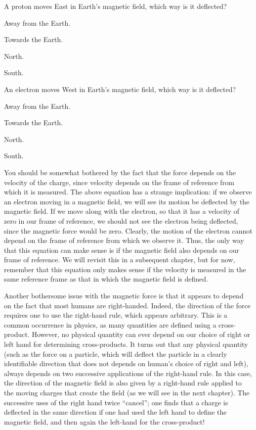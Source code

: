 \begin{checkpoint}{}
	\begin{MCquestion}{A proton moves East in Earth's magnetic field, which way is it deflected?}
		\item Away from the Earth. \correct
		\item Towards the Earth. 
		\item North.
		\item South.
	\end{MCquestion}
\end{checkpoint}

\begin{checkpoint}{}
	\begin{MCquestion}{An electron moves West in Earth's magnetic field, which way is it deflected?}
		\item Away from the Earth. \correct
		\item Towards the Earth. 
		\item North.
		\item South.
	\end{MCquestion}
\end{checkpoint}

You should be somewhat bothered by the fact that the force depends on the velocity of the charge, since velocity depends on the frame of reference from which it is measured. The above equation has a strange implication: if we observe an electron moving in a magnetic field, we will see its motion be deflected by the magnetic field. If we move along with the electron, so that it has a velocity of zero in our frame of reference, we should not see the electron being deflected, since the magnetic force would be zero. Clearly, the motion of the electron cannot depend on the frame of reference from which we observe it. Thus, the only way that this equation can make sense is if the magnetic field also depends on our frame of reference. We will revisit this in a subsequent chapter, but for now, remember that this equation only makes sense if the velocity is measured in the same reference frame as that in which the magnetic field is defined.

Another bothersome issue with the magnetic force is that it appears to depend on the fact that most humans are right-handed. Indeed, the direction of the force requires one to use the right-hand rule, which appears arbitrary. This is a common occurrence in physics, as many quantities are defined using a cross-product. However, no physical quantity can ever depend on our choice of right or left hand for determining cross-products. It turns out that any physical quantity (such as the force on a particle, which will deflect the particle in a clearly identifiable direction that does not depends on human's choice of right and left), always depends on two successive applications of the right-hand rule. In this case, the direction of the magnetic field is also given by a right-hand rule applied to the moving charges that create the field (as we will see in the next chapter). The successive uses of the right hand twice ``cancel''; one finds that a charge is deflected in the same direction if one had used the left hand to define the magnetic field, and then again the left-hand for the cross-product!

